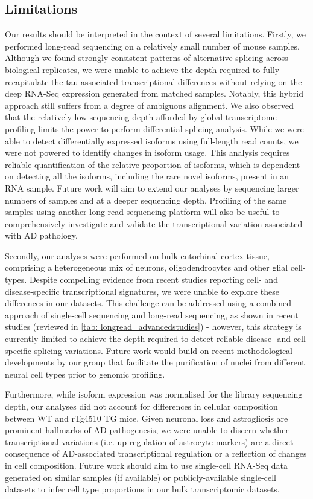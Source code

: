 \subsection{Limitations}
\label{ch5: limitations}
Our results should be interpreted in the context of several limitations. Firstly, we performed long-read sequencing on a relatively small number of mouse samples. Although we found strongly consistent patterns of alternative splicing across biological replicates, we were unable to achieve the depth required to fully recapitulate the tau-associated transcriptional differences without relying on the deep RNA-Seq expression generated from matched samples. Notably, this hybrid approach still suffers from a degree of ambiguous alignment. We also observed that the relatively low sequencing depth afforded by global transcriptome profiling limits the power to perform differential splicing analysis. While we were able to detect differentially expressed isoforms using full-length read counts, we were not powered to identify changes in isoform usage. This analysis requires reliable quantification of the relative proportion of isoforms, which is dependent on detecting all the isoforms, including the rare novel isoforms, present in an RNA sample. Future work will aim to extend our analyses by sequencing larger numbers of samples and at a deeper sequencing depth. Profiling of the same samples using another long-read sequencing platform will also be useful to comprehensively investigate and validate the transcriptional variation associated with AD pathology. 

Secondly, our analyses were performed on bulk entorhinal cortex tissue, comprising a heterogeneous mix of neurons, oligodendrocytes and other glial cell-types. Despite compelling evidence from recent studies reporting cell- and disease-specific transcriptional signatures, we were unable to explore these differences in our datasets. This challenge can be addressed using a combined approach of single-cell sequencing and long-read sequencing, as shown in recent studies (reviewed in \cref{tab: longread_advancedstudies}) - however, this strategy is currently limited to achieve the depth required to detect reliable disease- and cell-specific splicing variations. Future work would build on recent methodological developments by our group that facilitate the purification of nuclei from different neural cell types prior to genomic profiling\cite{Stefprotocol}. 

Furthermore, while isoform expression was normalised for the library sequencing depth, our analyses did not account for differences in cellular composition between WT and rTg4510 TG mice. Given neuronal loss and astrogliosis are prominent hallmarks of AD pathogenesis, we were unable to discern whether transcriptional variations (i.e. up-regulation of astrocyte markers) are a direct consequence of AD-associated transcriptional regulation or a reflection of changes in cell composition. Future work should aim to use single-cell RNA-Seq data generated on similar samples (if available) or publicly-available single-cell datasets\cite{Joglekar2021} to infer cell type proportions in our bulk transcriptomic datasets. 

